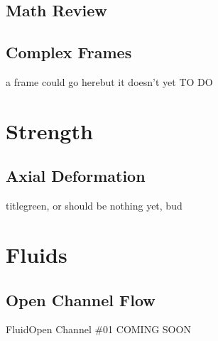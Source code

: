 \documentclass[9pt,xcolor={svgnames, x11names}]{beamer}
\begin{document}

    \subsection{Math Review}


    \subsection{Complex Frames}

    \begin{frame}{a frame could go here}{but it doesn't yet}
        TO DO
    \end{frame}

    \section{Strength}
    \subsection{Axial Deformation}

    \begin{frame}{title}{green, or should be}
        nothing yet, bud
    \end{frame}

    \section{Fluids}
    \subsection{Open Channel Flow}

    \begin{frame}{Fluid}{Open Channel \#01}
        COMING SOON
    \end{frame}
    
\end{document}
